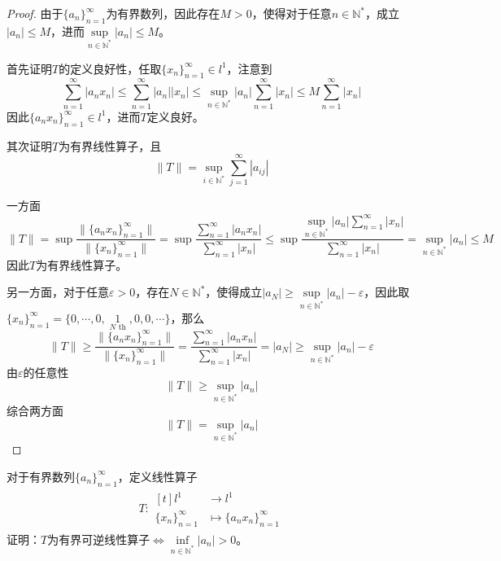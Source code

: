 \documentclass[lang = cn, scheme = chinese, 10pt]{elegantbook}
\newcommand{\N}{\mathbb{N}}  %
\begin{document}
\begin{proof}
	由于$\{ a_n \}_{n=1}^{\infty}$为有界数列，因此存在$M>0$，使得对于任意$n\in\N^*$，成立$|a_n|\le M$，进而$\sup\limits_{n\in\N^*}|a_n|\le M$。
	
	首先证明$T$的定义良好性，任取$\{x_n\}_{n=1}^{\infty}\in l^1$，注意到
	$$
	\sum_{n=1}^{\infty}|a_nx_n|\le
	\sum_{n=1}^{\infty}|a_n||x_n|\le
	\sup_{n\in\N^*}|a_n|\sum_{n=1}^{\infty}|x_n|\le
	M\sum_{n=1}^{\infty}|x_n|
	$$
	因此$\{ a_nx_n \}_{n=1}^{\infty}\in l^1$，进而$T$定义良好。
	
	其次证明$T$为有界线性算子，且
	$$
	\|T\|=\sup_{i\in\N^*}\sum_{j=1}^{\infty}|a_{ij}|
	$$
	
	一方面
	$$
	\|T\|=\sup\frac{\|\{ a_nx_n \}_{n=1}^{\infty}\|}{\|\{ x_n \}_{n=1}^{\infty}\|}
	=\sup\frac{\displaystyle\sum_{n=1}^{\infty}|a_nx_n|}{\displaystyle\sum_{n=1}^{\infty}|x_n|}
	\le \sup\frac{\displaystyle\sup_{n\in\N^*}|a_n|\sum_{n=1}^{\infty}|x_n|}{\displaystyle\sum_{n=1}^{\infty}|x_n|}=\sup_{n\in\N^*}|a_n|\le M
	$$
	因此$T$为有界线性算子。
	
	另一方面，对于任意$\varepsilon>0$，存在$N\in\N^*$，使得成立$|a_N|\ge \sup\limits_{n\in\N^*}|a_n|-\varepsilon$，因此取$\{ x_n \}_{n=1}^\infty=\{ 0,\cdots,0,\mathop{1}\limits_{N \text{ th}},0,0,\cdots \}$，那么
	$$
	\|T\|
	\ge\frac{\|\{ a_nx_n \}_{n=1}^{\infty}\|}{\|\{ x_n \}_{n=1}^{\infty}\|}
	=\frac{\displaystyle\sum_{n=1}^{\infty}|a_nx_n|}{\displaystyle\sum_{n=1}^{\infty}|x_n|}
	=|a_N|\ge \sup\limits_{n\in\N^*}|a_n|-\varepsilon
	$$
	由$\varepsilon$的任意性
	$$
	\|T\|
	\ge \sup\limits_{n\in\N^*}|a_n|
	$$
	综合两方面
	$$
	\|T\|=\sup_{n\in\N^*}|a_n|
	$$
\end{proof}

\begin{proposition}
	对于有界数列$\{ a_n \}_{n=1}^{\infty}$，定义线性算子
	\nonumber\begin{align}
		T:\begin{aligned}[t]
			l^1&\longrightarrow l^1\\
			\{ x_n \}_{n=1}^{\infty}&\longmapsto \{ a_nx_n \}_{n=1}^{\infty}
		\end{aligned}
	\end{align}
	证明：$T$为有界可逆线性算子$\iff \inf\limits_{n\in\N^*}|a_n|>0$。
\end{proposition}
\end{document}
